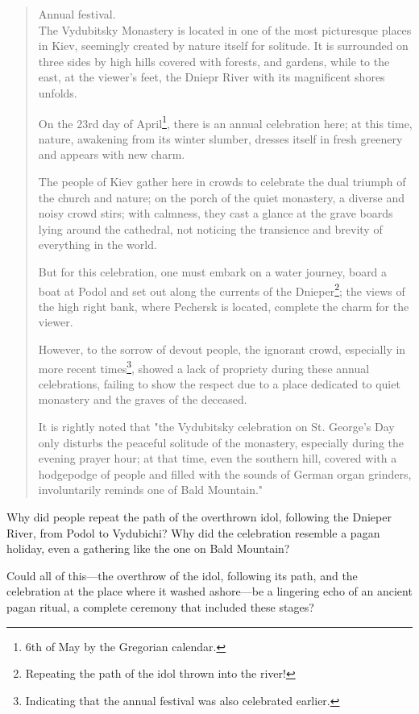 \documentclass[a5paper,11pt,openany]{article}
\begin{document}
\begin{quotation}
Annual festival.\\

The Vydubitsky Monastery is located in one of the most picturesque places in Kiev, seemingly created by nature itself for solitude. It is surrounded on three sides by high hills covered with forests, and gardens, while to the east, at the viewer's feet, the Dniepr River with its magnificent shores unfolds.

On the 23rd day of April\footnote{6th of May by the Gregorian calendar.}, there is an annual celebration here; at this time, nature, awakening from its winter slumber, dresses itself in fresh greenery and appears with new charm.

The people of Kiev gather here in crowds to celebrate the dual triumph of the church and nature; on the porch of the quiet monas\-tery, a diverse and noisy crowd stirs; with calmness, they cast a glance at the grave boards lying around the cathedral, not noticing the transience and brevity of everything in the world.

But for this celebration, one must embark on a water journey, board a boat at Podol and set out along the currents of the Dnieper\footnote{Repeating the path of the idol thrown into the river!}; the views of the high right bank, where Pechersk is located, complete the charm for the viewer.

However, to the sorrow of devout people, the ignorant crowd, especially in more recent times\footnote{Indicating that the annual festival was also celebrated earlier.}, showed a lack of propriety during these annual celebrations, failing to show the respect due to a place dedicated to quiet monastery and the graves of the deceased.

It is rightly noted that "the Vydubitsky celebration on St. George's Day only disturbs the peaceful solitude of the monastery, especially during the evening prayer hour; at that time, even the southern hill, covered with a hodgepodge of people and filled with the sounds of German organ grinders, involuntarily reminds one of Bald Mountain."
\end{quotation}

Why did people repeat the path of the overthrown idol, following the Dnieper River, from Podol to Vydubichi? Why did the celebration resemble a pagan holiday, even a gathering like the one on Bald Mountain?

Could all of this—the overthrow of the idol, following its path, and the celebration at the place where it washed ashore—be a lingering echo of an ancient pagan ritual, a complete ceremony that included these stages?
\end{document}
